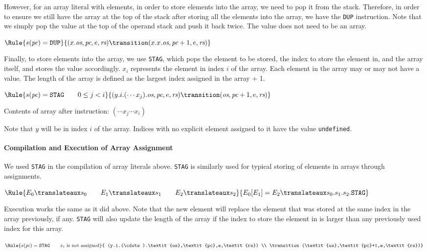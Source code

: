 However, for an array literal with elements, in order to store elements
into the array, we need to pop it from the stack. Therefore, in order
to ensure we still have the array at the top of the stack after storing
all the elements into the array, we have the \texttt{DUP} instruction.
Note that we simply pop the value at the top of the operand stack
and push it back twice. The value does not need to be an array.

$\Rule{s(\textit{pc}) = \texttt{DUP}}{
(x.\textit{os},\textit{pc},e,\textit{rs}) \transition
(x.x.\textit{os},\textit{pc}+1,e,\textit{rs})}
$

Finally, to store elements into the array, we use \texttt{STAG}, which pops the
element to be stored, the index to store the element in, and the array
itself, and stores the value accordingly. $x_i$ represents the element
in index $i$ of the array. Each element in the array may or may not have
a value. The length of the array is defined as the largest
index assigned in the array + 1.

$\Rule{s(\textit{pc}) = \texttt{STAG}\qquad 0 \leq j < i}{
(y.i.(\cdots x_j).\textit{os},\textit{pc},e,\textit{rs})
\transition (\textit{os},\textit{pc}+1,e,\textit{rs})}
$

Contents of array after instruction: $(\cdots x_j \cdots x_i)$

Note that $y$ will be in index $i$ of the array. Indices with no explicit
element assigned to it have the value \texttt{undefined}.

\paragraph{Compilation and Execution of Array Assignment}
We used \texttt{STAG} in the compilation of array literals
above. \texttt{STAG} is similarly used for typical storing of elements in
arrays through assignments.

$\Rule{
E_0 \translateaux s_0 \qquad E_1 \translateaux s_1 \qquad E_2 \translateaux s_2}
{E_0\lbrack E_1\rbrack = E_2 \translateaux s_0.s_1.s_2.\texttt{STAG}}
$

Execution works the same as it did above. Note that the new element will replace
the element that was stored at the same index in the array previously, if any.
\texttt{STAG} will also update the length of the array if the index to
store the element in is larger than any previously used index for this array.

$\Rule{s(\textit{pc}) = \texttt{STAG} \qquad x_i \text{ is not assigned}}{
(y.i.(\cdots).\textit{os},\textit{pc},e,\textit{rs}) \\
\transition (\textit{os},\textit{pc}+1,e,\textit{rs})}
$

